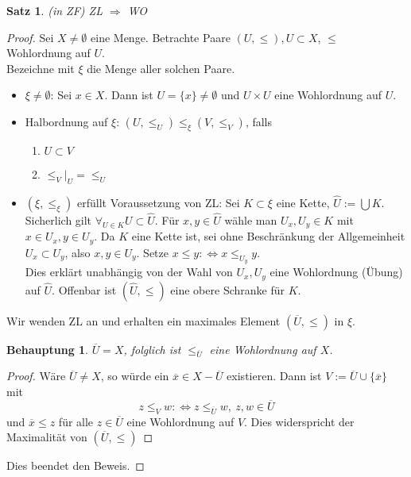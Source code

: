 \documentclass[12pt,a4paper]{article}
\newtheorem{theorem}{Satz}
\newtheorem*{claim*}{Behauptung}
\theoremstyle{definition}
\theoremstyle{remark}
\renewcommand{\bar}[1]{\overline{#1}}
\renewcommand{\hat}[1]{\widehat{#1}}
\begin{document}
		\begin{theorem}{(in ZF)}
			ZL $\Rightarrow$ WO
		\end{theorem}
		\begin{proof}
			Sei $X \neq \emptyset$ eine Menge. Betrachte Paare $(U, \leq), U \subset X$, $\leq$ Wohlordnung auf $U$. \\
			Bezeichne mit $\xi$ die Menge aller solchen Paare.
			\begin{itemize}
				\item 
					$\xi \neq \emptyset$: Sei $x \in X$. Dann ist $U = \{ x \} \neq \emptyset$ und $U \times U$ eine Wohlordnung auf $U$.
				\item 
					Halbordnung auf $\xi$: $(U, \leq_U) \leq_{\xi} (V, \leq_V)$, falls
					\begin{enumerate}
						\item 
							$U \subset V$
						\item 
							$\leq_V |_U = \leq_U$
					\end{enumerate}
				\item 
					$(\xi, \leq_{\xi})$ erfüllt Voraussetzung von ZL: Sei $K \subset \xi$ eine Kette, $\hat{U}:= \bigcup K$. Sicherlich gilt $\forall_{U \in K} U \subset \hat{U}$. Für $x,y \in \hat{U}$ wähle man $U_x, U_y \in K$ mit $x \in U_x, y \in U_y$. Da $K$ eine Kette ist, sei ohne Beschränkung der Allgemeinheit $U_x \subset U_y$, also $x, y \in U_y$. Setze $x \leq y :\Leftrightarrow x \leq_{U_y} y$. \\
					Dies erklärt unabhängig von der Wahl von $U_x, U_y$ eine Wohlordnung (Übung) auf $\hat{U}$. Offenbar ist $(\hat{U}, \leq)$ eine obere Schranke für $K$.
			\end{itemize}
			Wir wenden ZL an und erhalten ein maximales Element $(\bar{U}, \leq)$ in $\xi$.
			\begin{claim*}
				$\bar{U}=X$, folglich ist $\leq_{\bar{U}}$ eine Wohlordnung auf $X$.
			\end{claim*}
			\begin{proof}
				Wäre $\bar{U} \neq X$, so würde ein $\bar{x} \in X - \bar{U}$ existieren. Dann ist $V := \bar{U} \cup \{ \bar{x} \}$ mit
				\begin{equation}
					z \leq_V w :\Leftrightarrow z \leq_{\bar{U}} w, \ z,w \in \bar{U}
				\end{equation}
				und $\bar{x} \leq z$ für alle $z \in \bar{U}$ eine Wohlordnung auf $V$. Dies widerspricht der Maximalität von $(\bar{U}, \leq)$
			\end{proof}
			Dies beendet den Beweis.
		\end{proof}
\end{document}
